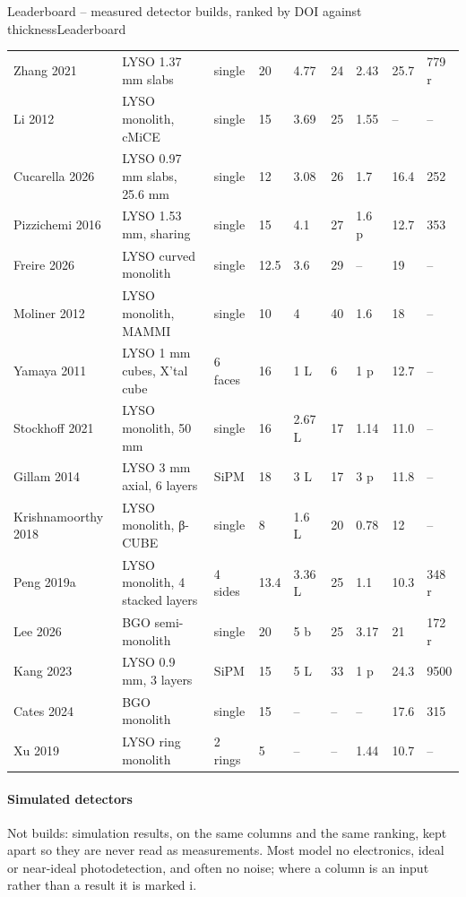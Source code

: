 \begin{programnote}{Leaderboard -- measured detector builds, ranked by DOI against thickness}{Leaderboard}
\begin{center}
\begin{scriptsize}
\begin{tabular}{lllllllll}
Zhang 2021 & LYSO 1.37 mm slabs & single & 20 & 4.77 & 24 & 2.43 & 25.7 & 779 r \\
Li 2012 & LYSO monolith, cMiCE & single & 15 & 3.69 & 25 & 1.55 & -- & -- \\
Cucarella 2026 & LYSO 0.97 mm slabs, 25.6 mm & single & 12 & 3.08 & 26 & 1.7 & 16.4 & 252 \\
Pizzichemi 2016 & LYSO 1.53 mm, sharing & single & 15 & 4.1 & 27 & 1.6 p & 12.7 & 353 \\
Freire 2026 & LYSO curved monolith & single & 12.5 & 3.6 & 29 & -- & 19 & -- \\
Moliner 2012 & LYSO monolith, MAMMI & single & 10 & 4 & 40 & 1.6 & 18 & -- \\
\hline
Yamaya 2011 & LYSO 1 mm cubes, X'tal cube & 6 faces & 16 & 1 L & 6 & 1 p & 12.7 & -- \\
Stockhoff 2021 & LYSO monolith, 50 mm & single & 16 & 2.67 L & 17 & 1.14 & 11.0 & -- \\
Gillam 2014 & LYSO 3 mm axial, 6 layers & SiPM & 18 & 3 L & 17 & 3 p & 11.8 & -- \\
Krishnamoorthy 2018 & LYSO monolith, β-CUBE & single & 8 & 1.6 L & 20 & 0.78 & 12 & -- \\
Peng 2019a & LYSO monolith, 4 stacked layers & 4 sides & 13.4 & 3.36 L & 25 & 1.1 & 10.3 & 348 r \\
Lee 2026 & BGO semi-monolith & single & 20 & 5 b & 25 & 3.17 & 21 & 172 r \\
Kang 2023 & LYSO 0.9 mm, 3 layers & SiPM & 15 & 5 L & 33 & 1 p & 24.3 & 9500 \\
Cates 2024 & BGO monolith & single & 15 & -- & -- & -- & 17.6 & 315 \\
Xu 2019 & LYSO ring monolith & 2 rings & 5 & -- & -- & 1.44 & 10.7 & -- \\
\hline
\end{tabular}
\end{scriptsize}
\end{center}

\paragraph{Simulated detectors}
Not builds: simulation results, on the same columns and the same ranking, kept
apart so they are never read as measurements. Most model no electronics, ideal
or near-ideal photodetection, and often no noise; where a column is an input
rather than a result it is marked i.


\end{programnote}
